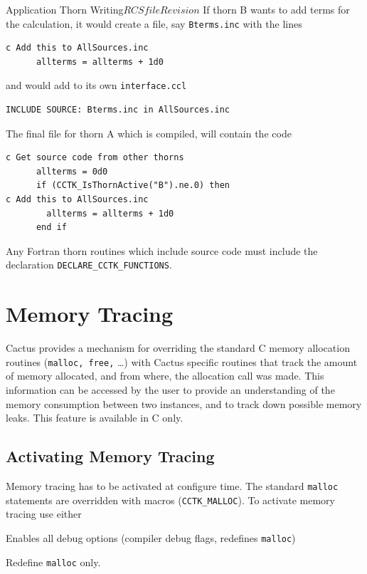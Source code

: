 \begin{cactuspart}{Application Thorn Writing}{$RCSfile$}{$Revision$}
If thorn B wants to add terms for the calculation, it would
create a file, say \texttt{Bterms.inc} with the lines
\begin{verbatim}
c Add this to AllSources.inc
      allterms = allterms + 1d0
\end{verbatim}
and would add to its own \texttt{interface.ccl}

\begin{verbatim}
INCLUDE SOURCE: Bterms.inc in AllSources.inc
\end{verbatim}

The final file for thorn A which is compiled, will contain the code
\begin{verbatim}
c Get source code from other thorns
      allterms = 0d0
      if (CCTK_IsThornActive("B").ne.0) then
c Add this to AllSources.inc
        allterms = allterms + 1d0
      end if
\end{verbatim}

Any Fortran thorn routines which include source code must include
the declaration \texttt{DECLARE\_CCTK\_FUNCTIONS}.


\section{Memory Tracing}
\label{sec:metr}

Cactus provides a mechanism for overriding the standard C memory
allocation routines (\texttt{malloc, free,} \ldots) with Cactus specific
routines that track the amount of memory allocated, and from where, the
allocation call was made. This information can be accessed by the user
to provide an understanding of the memory consumption between two
instances, and to track down possible memory leaks. This feature is
available in C only.

\subsection{Activating Memory Tracing}
\label{sec:acmetr}

Memory tracing has to be activated at configure time. The standard
\texttt{malloc} statements are overridden with macros (\texttt{CCTK\_MALLOC}).  To
activate memory tracing use either

\begin{Lentry}
\item[\texttt{DEBUG=all}]  Enables all debug options (compiler debug
flags, redefines \texttt{malloc})
\item[\texttt{DEBUG=memory}] Redefine \texttt{malloc} only.
\end{Lentry}


\end{cactuspart}
